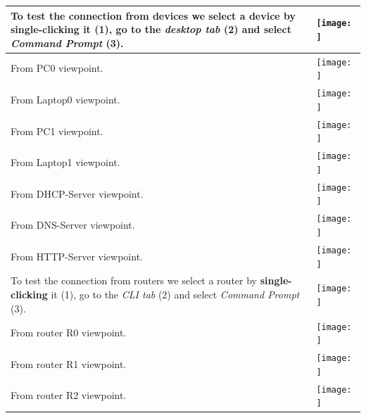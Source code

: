 \documentclass[11pt,a4paper]{report}
\begin{document}
\begin{flushleft}
\begin{center}
\begin{longtable}{ m{5cm} l }
                    To test the connection from devices we select a device by \textbf{single-clicking} it (1), go to the \textit{desktop tab} (2) and select \textit{Command Prompt} (3).   & \texttt{[image: ]} \\ \hline
                    From PC0 viewpoint.                                                                                                                                                     & \texttt{[image: ]} \\ \hline
                    From Laptop0 viewpoint.                                                                                                                                                 & \texttt{[image: ]} \\ \hline
                    From PC1 viewpoint.                                                                                                                                                     & \texttt{[image: ]} \\ \hline
                    From Laptop1 viewpoint.                                                                                                                                                 & \texttt{[image: ]} \\ \hline
                    From DHCP-Server viewpoint.                                                                                                                                             & \texttt{[image: ]} \\ \hline
                    From DNS-Server viewpoint.                                                                                                                                              & \texttt{[image: ]} \\ \hline
                    From HTTP-Server viewpoint.                                                                                                                                             & \texttt{[image: ]} \\ \hline
                    To test the connection from routers we select a router by \textbf{single-clicking} it (1), go to the \textit{CLI tab} (2) and select \textit{Command Prompt} (3).       & \texttt{[image: ]} \\ \hline
                    From router R0 viewpoint.                                                                                                                                               & \texttt{[image: ]} \\ \hline
                    From router R1 viewpoint.                                                                                                                                               & \texttt{[image: ]} \\ \hline
                    From router R2 viewpoint.                                                                                                                                               & \texttt{[image: ]} \\ \hline


\end{longtable}
\end{center}
\end{flushleft}
\end{document}
